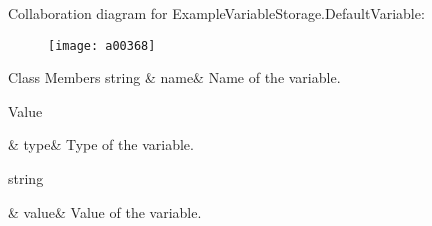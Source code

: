 Collaboration diagram for Example\-Variable\-Storage.\-Default\-Variable\-:
\nopagebreak
\begin{figure}[H]
\begin{center}
\leavevmode
\texttt{[image: a00368]}
\end{center}
\end{figure}
\begin{DoxyFields}{Class Members}
\hypertarget{a00079_a609feaa53936e7dc42248ff2ba68454a}{string}\label{a00079_a609feaa53936e7dc42248ff2ba68454a}
&
name&
Name of the variable. \\
\hline

\hypertarget{a00079_a904347efdca12f40243c7dedb646153d}{Value}\label{a00079_a904347efdca12f40243c7dedb646153d}
&
type&
Type of the variable. \\
\hline

\hypertarget{a00079_a0f00ecb21b58aa754a4bbb61edf62818}{string}\label{a00079_a0f00ecb21b58aa754a4bbb61edf62818}
&
value&
Value of the variable. \\
\hline

\end{DoxyFields}
